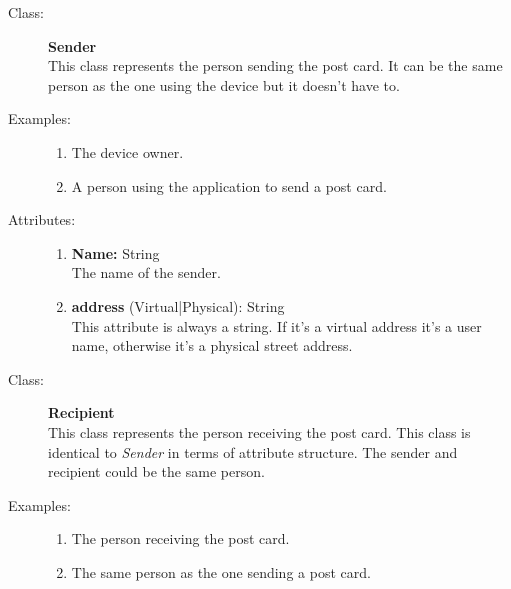 \documentclass[10pt,a4paper]{article}
\begin{document}
\begin{description}
\item[Class:] \textbf{Sender} \hfill \\
This class represents the person sending the post card. It can be the same person as the one using the device but it doesn't have to.

\item[Examples:] \hfill
\begin{enumerate}
\item The device owner.
\item A person using the application to send a post card.
\end{enumerate}

\item[Attributes:] \hfill
\begin{enumerate}
\item \textbf{Name:} String \hfill \\The name of the sender. 
\item \textbf{address} (Virtual|Physical): String \hfill \\This attribute is always a string. If it's a virtual address it's a user name, otherwise it's a physical street address. 
\end{enumerate}
\end{description}

\hrulefill

\begin{description}
\item[Class:] \textbf{Recipient} \hfill \\
This class represents the person receiving the post card. This class is identical to \textit{Sender} in terms of attribute structure. The sender and recipient could be the same person.

\item[Examples:] \hfill
\begin{enumerate}
\item The person receiving the post card.
\item The same person as the one sending a post card.
\end{enumerate}
\end{description}

\hrulefill
\end{document}
